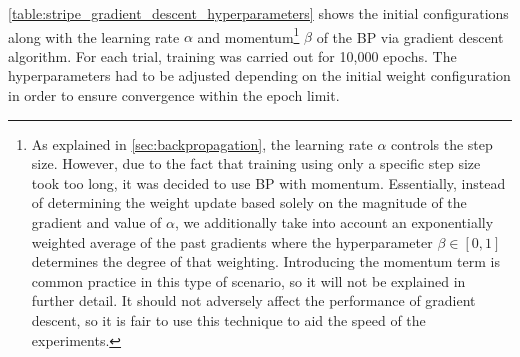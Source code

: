 \ref{table:stripe_gradient_descent_hyperparameters} shows the initial configurations along with the learning rate $\alpha$ and momentum\footnote{
    As explained in \ref{sec:backpropagation}, the learning rate $\alpha$ controls the step size.
    However, due to the fact that training using only a specific step size took too long, it was decided to use BP with momentum.
    Essentially, instead of determining the weight update based solely on the magnitude of the gradient and value of $\alpha$, we additionally take into account an exponentially weighted average of the past gradients where the hyperparameter $\beta\in[0,1]$ determines the degree of that weighting.
    Introducing the momentum term is common practice in this type of scenario, so it will not be explained in further detail.
    It should not adversely affect the performance of gradient descent, so it is fair to use this technique to aid the speed of the experiments.
}
$\beta$ of the BP via gradient descent algorithm.
For each trial, training was carried out for 10,000 epochs. 
The hyperparameters had to be adjusted depending on the initial weight configuration in order to ensure convergence within the epoch limit.
